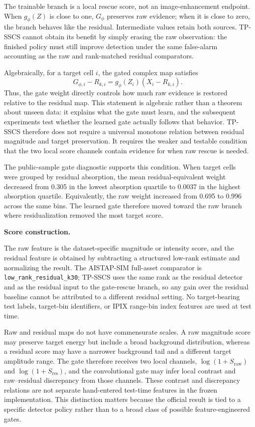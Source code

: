 \documentclass[journal]{IEEEtran}
\begin{document}
The trainable branch is a local rescue score, not an image-enhancement endpoint. When $g_\phi(Z)$ is close to one, $G_\phi$ preserves raw evidence; when it is close to zero, the branch behaves like the residual. Intermediate values retain both sources. TP-SSCS cannot obtain its benefit by simply erasing the raw observation: the finished policy must still improve detection under the same false-alarm accounting as the raw and rank-matched residual comparators.

Algebraically, for a target cell $i$, the gated complex map satisfies
\begin{equation}
    G_{\phi,i} - R_{k,i}
    = g_\phi(Z_i)(X_i-R_{k,i}) .
\end{equation}
Thus, the gate weight directly controls how much raw evidence is restored relative to the residual map. This statement is algebraic rather than a theorem about unseen data: it explains what the gate must learn, and the subsequent experiments test whether the learned gate actually follows that behavior. TP-SSCS therefore does not require a universal monotone relation between residual magnitude and target preservation. It requires the weaker and testable condition that the two local score channels contain evidence for when raw rescue is needed.

The public-sample gate diagnostic supports this condition. When target cells were grouped by residual absorption, the mean residual-equivalent weight decreased from 0.305 in the lowest absorption quartile to 0.0037 in the highest absorption quartile. Equivalently, the raw weight increased from 0.695 to 0.996 across the same bins. The learned gate therefore moved toward the raw branch where residualization removed the most target score.

\noindent\textbf{Score construction.}

The raw feature is the dataset-specific magnitude or intensity score, and the residual feature is obtained by subtracting a structured low-rank estimate and normalizing the result. The AISTAP-SIM full-asset comparator is \texttt{low\_rank\_residual\_k30}; TP-SSCS uses the same rank as the residual detector and as the residual input to the gate-rescue branch, so any gain over the residual baseline cannot be attributed to a different residual setting. No target-bearing test labels, target-bin identifiers, or IPIX range-bin index features are used at test time.

Raw and residual maps do not have commensurate scales. A raw magnitude score may preserve target energy but include a broad background distribution, whereas a residual score may have a narrower background tail and a different target amplitude range. The gate therefore receives two local channels, $\log(1+S_{\mathrm{raw}})$ and $\log(1+S_{\mathrm{res}})$, and the convolutional gate may infer local contrast and raw--residual discrepancy from those channels. These contrast and discrepancy relations are not separate hand-entered test-time features in the frozen implementation. This distinction matters because the official result is tied to a specific detector policy rather than to a broad class of possible feature-engineered gates.
\end{document}
